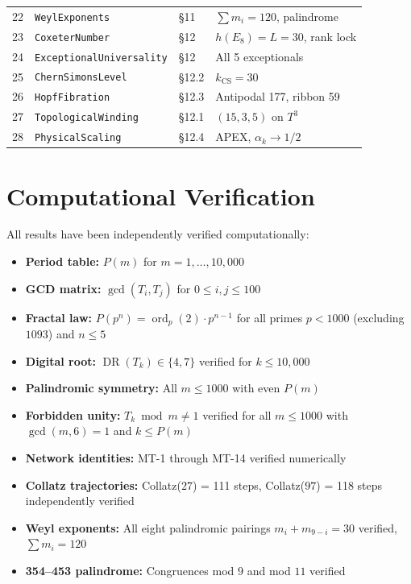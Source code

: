 \documentclass[11pt, a4paper]{article}
\theoremstyle{plain}
\theoremstyle{definition}
\theoremstyle{remark}
\newcommand{\ord}{\operatorname{ord}}
\DeclareMathOperator{\DR}{DR}
\begin{document}
\begin{table}[H]
\begin{tabular}{@{}rlll@{}}
22 & \texttt{WeylExponents}        & \S11   & $\sum m_i = 120$, palindrome \\
23 & \texttt{CoxeterNumber}        & \S12   & $h(E_8)=L=30$, rank lock \\
24 & \texttt{ExceptionalUniversality} & \S12 & All 5 exceptionals \\
25 & \texttt{ChernSimonsLevel}     & \S12.2 & $k_{\mathrm{CS}}=30$ \\
26 & \texttt{HopfFibration}        & \S12.3 & Antipodal 177, ribbon 59 \\
27 & \texttt{TopologicalWinding}   & \S12.1 & $(15,3,5)$ on $T^3$ \\
28 & \texttt{PhysicalScaling}      & \S12.4 & APEX, $\alpha_k \to 1/2$ \\
\bottomrule
\end{tabular}
\end{table}

\section{Computational Verification}\label{app:comp}

All results have been independently verified computationally:

\begin{itemize}
  \item \textbf{Period table:} $P(m)$ for $m = 1, \ldots, 10{,}000$
  \item \textbf{GCD matrix:} $\gcd(T_i, T_j)$ for
    $0 \leq i, j \leq 100$
  \item \textbf{Fractal law:} $P(p^n) = \ord_p(2) \cdot p^{n-1}$
    for all primes $p < 1000$ (excluding $1093$) and $n \leq 5$
  \item \textbf{Digital root:} $\DR(T_k) \in \{4, 7\}$ verified for
    $k \leq 10{,}000$
  \item \textbf{Palindromic symmetry:} All $m \leq 1000$ with
    even $P(m)$
  \item \textbf{Forbidden unity:} $T_k \bmod m \neq 1$ verified for all
    $m \leq 1000$ with $\gcd(m,6) = 1$ and $k \leq P(m)$
  \item \textbf{Network identities:} MT-1 through MT-14 verified
    numerically
  \item \textbf{Collatz trajectories:} Collatz($27$) = 111 steps,
    Collatz($97$) = 118 steps independently verified
  \item \textbf{Weyl exponents:} All eight palindromic pairings
    $m_i + m_{9-i} = 30$ verified, $\sum m_i = 120$
  \item \textbf{354--453 palindrome:} Congruences mod $9$ and mod $11$
    verified
\end{itemize}
\end{document}
